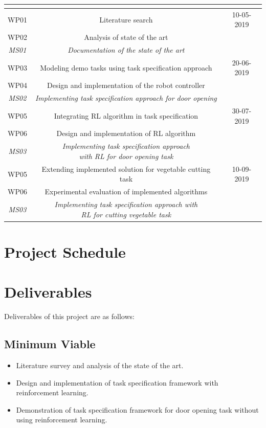 \documentclass[thesis]{mas_proposal}
\begin{document}
\begin{tabular}{|c|c|c|}

	\hline
	\multicolumn{2}{|c|}{\thead{Work Packages}} & \thead{Targeted date} \\
	\hline
	WP01 & Literature search & 10-05-2019 \\
	WP02 & Analysis of state of the art &  \\
	\textit{MS01} & \textit{Documentation of the state of the art} &  \\
	\hline 
	WP03 & Modeling demo tasks using task specification approach &  20-06-2019\\ 
	WP04 & Design and implementation of the robot controller &   \\
	\textit{MS02} & \textit{Implementing task specification approach for door opening} &  \\
	\hline
	WP05 & Integrating RL algorithm in task specification & 30-07-2019 \\ 
	WP06 & Design and implementation of RL algorithm &   \\
	\textit{MS03} & \makecell{\textit{Implementing task specification approach} \\ \textit{with RL for door opening task}} &  \\
	\hline
	WP05 & Extending implemented solution for vegetable cutting task & 10-09-2019 \\ 
	WP06 & Experimental evaluation of implemented algorithms &  \\
	\textit{MS03} & \makecell{\textit{Implementing task specification approach with} \\ \textit{RL for cutting vegetable task}} &  \\
	\hline
\end{tabular}


\section{Project Schedule}



\section{Deliverables}
Deliverables of this project are as follows: 
\subsection{Minimum Viable}

\begin{itemize}
    \item Literature survey and analysis of the state of the art.
    \item Design and implementation of task specification framework with reinforcement learning.
    \item Demonstration of task specification framework for door opening task without using reinforcement learning.
\end{itemize}
\end{document}
